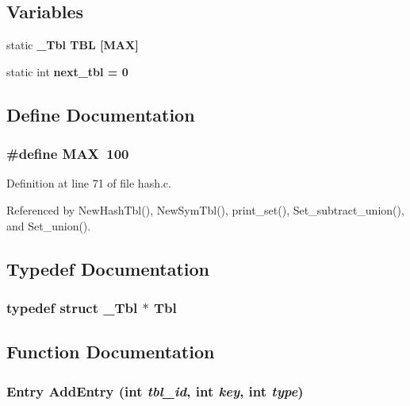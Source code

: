 \subsection*{Variables}
\begin{CompactItemize}
\item 
static \bf{\_\-Tbl} \bf{TBL} [MAX]
\item 
static int \bf{next\_\-tbl} = 0
\end{CompactItemize}


\subsection{Define Documentation}
\subsubsection{\setlength{\rightskip}{0pt plus 5cm}\#define MAX~100}\label{hash_8c_392fb874e547e582e9c66a08a1f23326}




Definition at line 71 of file hash.c.

Referenced by New\-Hash\-Tbl(), New\-Sym\-Tbl(), print\_\-set(), Set\_\-subtract\_\-union(), and Set\_\-union().

\subsection{Typedef Documentation}
\subsubsection{\setlength{\rightskip}{0pt plus 5cm}typedef struct \bf{\_\-Tbl} $\ast$ \bf{Tbl}}\label{hash_8c_87343d1392cc52e3265f7ba0e05a2cad}




\subsection{Function Documentation}
\subsubsection{\setlength{\rightskip}{0pt plus 5cm}\bf{Entry} Add\-Entry (int {\em tbl\_\-id}, int {\em key}, int {\em type})}\label{hash_8c_823e73343ed3cc602ec5a47446d148ef}


